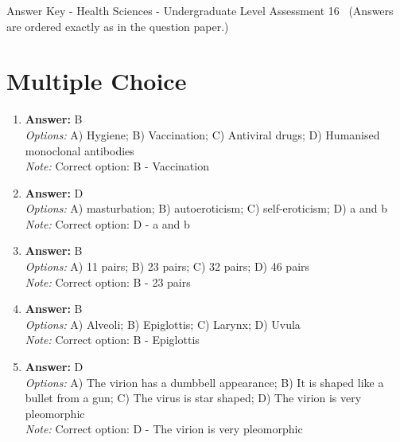 \documentclass[12pt]{article}
\begin{document}
\begin{center}
Answer Key - Health Sciences - Undergraduate Level Assessment 16 \
\small (Answers are ordered exactly as in the question paper.)
\end{center}

\section*{Multiple Choice}
\begin{enumerate}[label=\arabic*.]
\item \textbf{Answer:} B
\\ \textit{Options:} A) Hygiene; B) Vaccination; C) Antiviral drugs; D) Humanised monoclonal antibodies
\\ \textit{Note:} Correct option: B - Vaccination
\item \textbf{Answer:} D
\\ \textit{Options:} A) masturbation; B) autoeroticism; C) self-eroticism; D) a and b
\\ \textit{Note:} Correct option: D - a and b
\item \textbf{Answer:} B
\\ \textit{Options:} A) 11 pairs; B) 23 pairs; C) 32 pairs; D) 46 pairs
\\ \textit{Note:} Correct option: B - 23 pairs
\item \textbf{Answer:} B
\\ \textit{Options:} A) Alveoli; B) Epiglottis; C) Larynx; D) Uvula
\\ \textit{Note:} Correct option: B - Epiglottis
\item \textbf{Answer:} D
\\ \textit{Options:} A) The virion has a dumbbell appearance; B) It is shaped like a bullet from a gun; C) The virus is star shaped; D) The virion is very pleomorphic
\\ \textit{Note:} Correct option: D - The virion is very pleomorphic
\end{enumerate}
\end{document}
